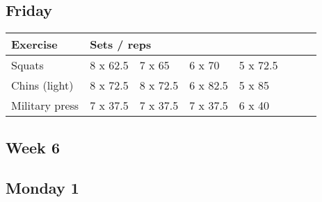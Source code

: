 \documentclass[12pt, a4paper]{article}%
\begin{document}
  \subsection*{\hspace{0.5em} Friday }


  \begin{tabular}{l|lllllll}
  \hspace{0.75em} \textbf{Exercise} & \multicolumn{ 7 }{l}{ \textbf{Sets / reps} } \\ \hline

            \hspace{0.75em} Squats
            & 8 x 62.5
            & 7 x 65
            & 6 x 70
            & 5 x 72.5
            & 
            & 
            & 
            \\


            \hspace{0.75em} Chins (light)
            & 8 x 72.5
            & 8 x 72.5
            & 6 x 82.5
            & 5 x 85
            & 
            & 
            & 
            \\


            \hspace{0.75em} Military press
            & 7 x 37.5
            & 7 x 37.5
            & 7 x 37.5
            & 6 x 40
            & 
            & 
            & 
            \\


  \end{tabular}


\clearpage \subsection*{\hspace{0.25em} Week 6 }
  \subsection*{\hspace{0.5em} Monday 1 }
\end{document}
